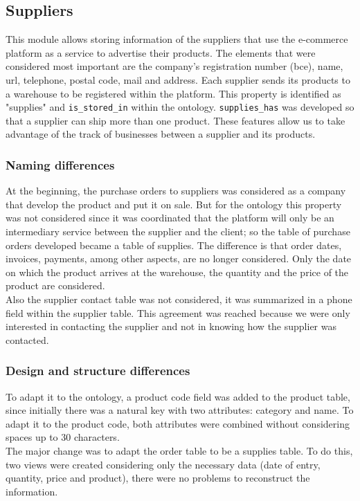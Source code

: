\documentclass{article}
\begin{document}
\subsection{Suppliers}
This module allows storing information of the suppliers that use the e-commerce platform as a service to advertise their products. The elements that were considered most important are the company's registration number (bce), name, url, telephone, postal code, mail and address. Each supplier sends its products to a warehouse to be registered within the platform. This property is identified as "supplies" and \texttt{is\_stored\_in} within the ontology. \texttt{supplies\_has} was developed so that a supplier can ship more than one product. These features allow us to take advantage of the track of businesses between a supplier and its products.
\subsubsection{Naming differences}
At the beginning, the purchase orders to suppliers was considered as a company that develop the product and put it on sale. But for the ontology this property was not considered since it was coordinated that the platform will only be an intermediary service between the supplier and the client; so the table of purchase orders developed became a table of supplies. The difference is that order dates, invoices, payments, among other aspects, are no longer considered. Only the date on which the product arrives at the warehouse, the quantity and the price of the product are considered. \\

Also the supplier contact table was not considered, it was summarized in a phone field within the supplier table. This agreement was reached because we were only interested in contacting the supplier and not in knowing how the supplier was contacted.

\subsubsection{Design and structure differences}
To adapt it to the ontology, a product code field was added to the product table, since initially there was a natural key with two attributes: category and name. To adapt it to the product code, both attributes were combined without considering spaces up to 30 characters. \\

The major change was to adapt the order table to be a supplies table. To do this, two views were created considering only the necessary data (date of entry, quantity, price and product), there were no problems to reconstruct the information.
\end{document}
